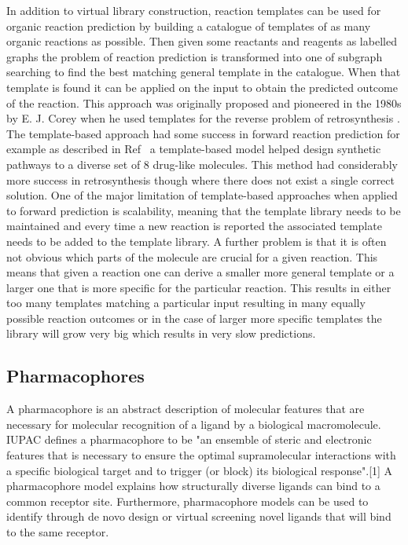 In addition to virtual library construction, reaction templates can be used for organic reaction prediction by building a catalogue of templates of as many organic reactions as possible. Then given some reactants and reagents as labelled graphs the problem of reaction prediction is transformed into one of subgraph searching to find the best matching general template in the catalogue. When that template is found it can be applied on the input to obtain the predicted outcome of the reaction. This approach was originally proposed and pioneered in the 1980s by E. J. Corey when he used templates for the reverse problem of retrosynthesis \cite{Corey1985Computer-assistedSynthesis}. The template-based approach had some success in forward reaction prediction for example as described in Ref~\cite{Klucznik2018EfficientLaboratory} a template-based model helped design synthetic pathways to a diverse set of 8 drug-like molecules. This method had considerably more success in retrosynthesis though where there does not exist a single correct solution. One of the major limitation of template-based approaches when applied to forward prediction is scalability, meaning that the template library needs to be maintained and every time a new reaction is reported the associated template needs to be added to the template library. A further problem is that it is often not obvious which parts of the molecule are crucial for a given reaction. This means that given a reaction one can derive a smaller more general template or a larger one that is more specific for the particular reaction. This results in either too many templates matching a particular input resulting in many equally possible reaction outcomes or in the case of larger more specific templates the library will grow very big which results in very slow predictions.

\subsection{Pharmacophores} \label{subsec:pharmacophores}

A pharmacophore is an abstract description of molecular features that are necessary for molecular recognition of a ligand by a biological macromolecule. IUPAC defines a pharmacophore to be "an ensemble of steric and electronic features that is necessary to ensure the optimal supramolecular interactions with a specific biological target and to trigger (or block) its biological response".[1] A pharmacophore model explains how structurally diverse ligands can bind to a common receptor site. Furthermore, pharmacophore models can be used to identify through de novo design or virtual screening novel ligands that will bind to the same receptor.

